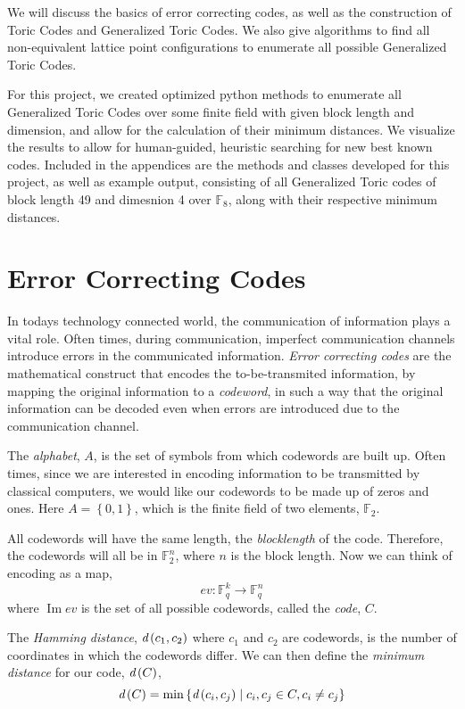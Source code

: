 \documentclass[12pt]{amsart}
\theoremstyle{plain}
\newcommand{\F}{\mathbb{F}}
\DeclareMathOperator{\im}{Im}
\newcommand{\dist}[1]{\mathrm{\emph{d}}\left(#1\right)}
\begin{document}
We will discuss the basics of error correcting codes, as well as the construction of Toric Codes and Generalized Toric Codes. We also give algorithms to find all non-equivalent lattice point configurations to enumerate all possible Generalized Toric Codes.

For this project, we created optimized python methods to enumerate all Generalized Toric Codes over some finite field with given block length and dimension, and allow for the calculation of their minimum distances. We visualize the results to allow for human-guided, heuristic searching for new best known codes. Included in the appendices are the methods and classes developed for this project, as well as example output, consisting of all Generalized Toric codes of block length 49 and dimesnion 4 over $\F_8$, along with their respective minimum distances.

\section{Error Correcting Codes}
In todays technology connected world, the communication of information plays a vital role. Often times, during communication, imperfect communication channels introduce errors in the communicated information. \emph{Error correcting codes} are the mathematical construct that encodes the to-be-transmited information, by mapping the original information to a \emph{codeword}, in such a way that the original information can be decoded even when errors are introduced due to the communication channel.

The \emph{alphabet}, $A$, is the set of symbols from which codewords are built up. Often times, since we are interested in encoding information to be transmitted by classical computers, we would like our codewords to be made up of zeros and ones. Here $A=\left\{0,1\right\}$, which is the finite field of two elements, $\F_2$.

All codewords will have the same length, the \emph{blocklength} of the code. Therefore, the codewords will all be in $\F_2^n$, where $n$ is the block length. Now we can think of encoding as a map,
\begin{equation*}
ev: \F_q^k \to \F_q^n
\end{equation*}
where $\im ev$ is the set of all possible codewords, called the \emph{code}, $C$.

The \emph{Hamming distance}, $\dist{c_1,c_2}$ where $c_1$ and $c_2$ are codewords, is the number of coordinates in which the codewords differ. We can then define the \emph{minimum distance} for our code, $\dist{C}$,
\begin{equation*}
\dist{C} = \min \left\{\dist{c_i,c_j} \mid c_{i},c_{j} \in C, c_{i} \neq c_{j} \right\}
\end{equation*}
\end{document}

